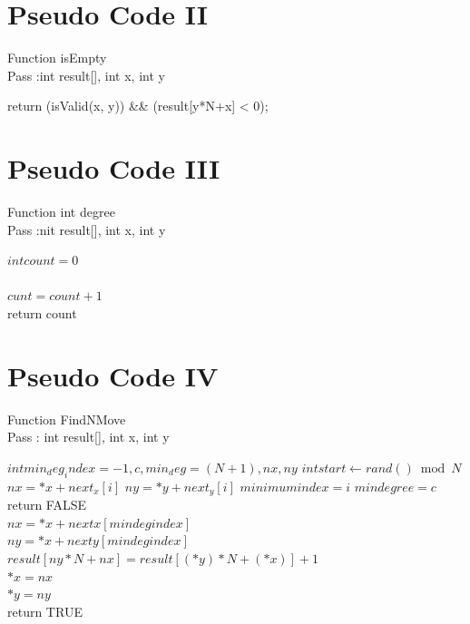\documentclass[conference]{IEEEtran}
\begin{document}
\section{\textbf{Pseudo Code II}} 
\noindent Function isEmpty \\
Pass :int  result[], int x, int y\\
\begin{algorithmic}
  	return (isValid(x, y)) && (result[y*N+x] < 0);
\end{algorithmic}


\section{\textbf{Pseudo Code III}} 
\noindent Function int degree \\
Pass :nit result[], int x, int y\\
\begin{algorithmic}
\STATE $int count =0$\\ 
	\\
	\STATE$cunt=count+1$\\
	return count
		
\end{algorithmic}


\section{\textbf{Pseudo Code IV}} 
\noindent Function FindNMove \\
Pass : int result[], int x, int y\\
\begin{algorithmic}
    \STATE $int min_deg_index =-1,c,min_deg=(N+1),nx,ny$
	\STATE $int start\gets rand()\bmod N$\\
	    \STATE $nx=*x+next_x[i]$
	    \STATE $ny=*y+next_y[i]$
            \STATE $minimum index =i$
            \STATE $min degree =c$
        \ENDIF
    \ENDFOR\\
    return FALSE\\
    \STATE $nx =*x+nextx[mindegindex]$\\
    \STATE $ny =*x+nexty[mindegindex]$\\
    \STATE $result[ny*N+nx]=result[(*y)*N+(*x)]+1$\\
    \STATE $*x=nx$\\
    \STATE $*y=ny$\\
    return TRUE
\end{algorithmic}
\end{document}
